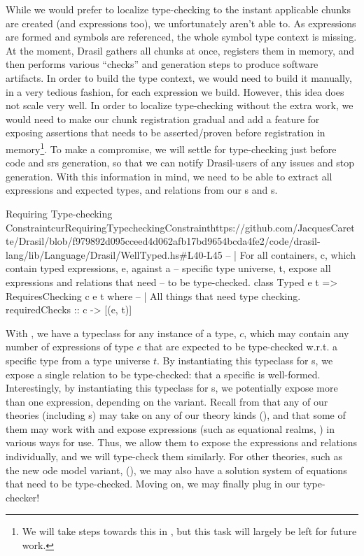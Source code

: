 While we would prefer to localize type-checking to the instant applicable chunks
are created (and expressions too), we unfortunately aren't able to. As
expressions are formed and symbols are referenced, the whole symbol type context
is missing. At the moment, Drasil gathers all chunks at once, registers them in
memory, and then performs various ``checks'' and generation steps to produce
software artifacts. In order to build the type context, we would need to build
it manually, in a very tedious fashion, for each expression we build. However,
this idea does not scale very well. In order to localize type-checking without
the extra work, we would need to make our chunk registration gradual and add a
feature for exposing assertions that needs to be asserted/proven before
registration in memory\footnote{We will take steps towards this in
, but this task will largely be left for future work.}.
To make a compromise, we will settle for type-checking just before code and
\acs{srs} generation, so that we can notify Drasil-users of any issues and stop
generation. With this information in mind, we need to be able to extract all
expressions and expected types, and relations from our \InstanceModel{}s and
\DataDefinition{}s.

\begin{haskell}{Requiring Type-checking Constraint}{curRequiringTypecheckingConstraint}{https://github.com/JacquesCarette/Drasil/blob/f979892d095cceed4d062afb17bd9654bcda4fe2/code/drasil-lang/lib/Language/Drasil/WellTyped.hs\#L40-L45}
-- | For all containers, c, which contain typed expressions, e, against a
--   specific type universe, t, expose all expressions and relations that need
--   to be type-checked.
class Typed e t => RequiresChecking c e t where
  -- | All things that need type checking.
  requiredChecks :: c -> [(e, t)]
\end{haskell}

With , we have a typeclass for any instance of a
type, \(c\), which may contain any number of expressions of type \(e\) that are
expected to be type-checked w.r.t. a specific type from a type universe \(t\).
By instantiating this typeclass for \DataDefinition{}s, we expose a single
relation to be type-checked: that a specific \QDefinition{} is well-formed.
Interestingly, by instantiating this typeclass for \InstanceModel{}s, we
potentially expose more than one expression, depending on the \ModelKind{}
variant. Recall from  that any of our theories (including
\InstanceModel{}s) may take on any of our theory kinds (\ModelKinds{}), and that
some of them may work with and expose expressions (such as equational realms,
)
in various ways for use. Thus, we allow them to expose the expressions and
relations individually, and we will type-check them similarly. For other
theories, such as the new \acs{ode} model variant, \NewDEModel{}
(\DifferentialModel{}), we may also have a solution system of equations
\cite{Chen2022MEng} that need to be type-checked. Moving on, we may finally plug
in our type-checker!

